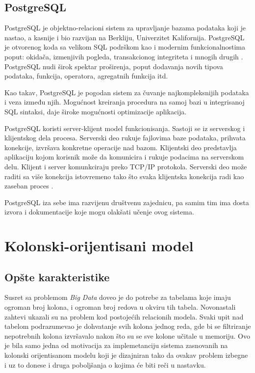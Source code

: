 \documentclass[12pt,oneside]{memoir}
\begin{document}
\subsection{PostgreSQL}


PostgreSQL je objektno-relacioni sistem za upravljanje bazama podataka koji je nastao, a kasnije i bio razvijan na Berkliju, Univerzitet Kalifornija. PostgreSQL je otvorenog koda sa velikom SQL podrškom kao i modernim funkcionalnostima poput: okidača, izmenjivih pogleda, transakcionog integriteta i mnogih drugih \cite{PostgresHistory}. PostgreSQL nudi širok spektar proširenja, poput dodavanja novih tipova podataka, funkcija, operatora, agregatnih funkcija itd. 

Kao takav, PostgreSQL je pogodan sistem za čuvanje najkompleksnijih podataka i veza između njih. Mogućnost kreiranja procedura na samoj bazi u integrisanoj SQL sintaksi, daje široke mogućnosti optimizacije aplikacija. 

PostgreSQL koristi server-klijent model funkcionisanja. Sastoji se iz serverskog i klijentskog dela procesa. Serverski deo rukuje fajlovima baze podataka, prihvata konekcije, izvršava konkretne operacije nad bazom. Klijentski deo predstavlja aplikaciju kojom korisnik može da komunicira i rukuje podacima na serverskom delu. Klijent i server komunkciraju preko TCP/IP protokola. Serverski deo može raditi sa više konekcija istovremeno tako što svaka klijentska konekcija radi kao zaseban proces \cite{PostgreSQLUpAndRunning}.

PostgreSQL iza sebe ima razvijenu društvenu zajednicu, pa samim tim ima dosta izvora i dokumentacije koje mogu olakšati učenje ovog sistema. 

\section{Kolonski-orijentisani model}
\subsection{Opšte karakteristike}

Susret sa problemom \textit{Big Data} doveo je do potrebe za tabelama koje imaju ogroman broj kolona, i ogroman broj redova u okviru tih tabela. Novonastali zahtevi ukazali su na problem kod postojećih  relacionih modela. Svaki upit nad tabelom podrazumevao je dohvatanje svih kolona jednog reda, gde bi se filtriranje nepotrebnih kolona izvršavalo nakon što su se sve kolone učitale u memoriju. Ovo je bila samo jedna od motivacija za implemetanciju sistema zasnovanih na kolonski orijentisanom modelu koji je dizajniran tako da ovakav problem izbegne i uz to donese i druga poboljšanja o kojima će biti reči u nastavku.
\end{document}
